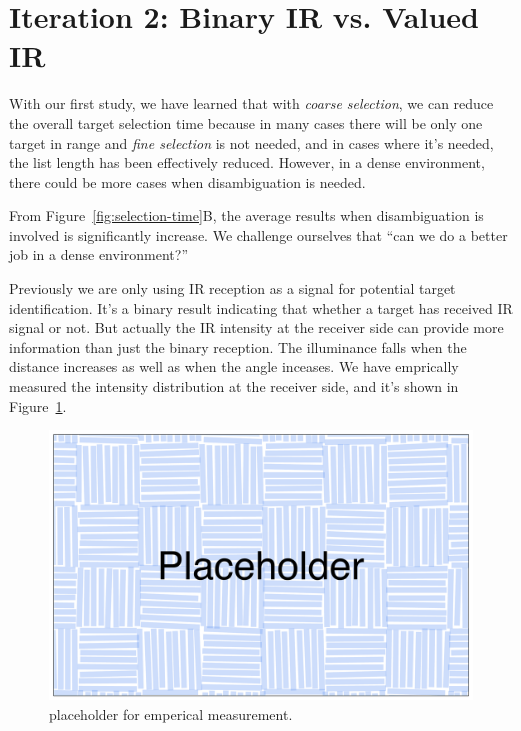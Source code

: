 \section{Iteration 2: Binary IR vs. Valued IR}

With our first study, we have learned that with {\em coarse selection}, we can reduce the overall target selection time because in many cases there will be only one target in range and {\em fine selection} is not needed, and in cases where it's needed, the list length has been effectively reduced. However, in a dense environment, there could be more cases when disambiguation is needed. 

From Figure~\ref{fig:selection-time}B, the average results when disambiguation is involved is significantly increase. We challenge ourselves that ``can we do a better job in a dense environment?''

Previously we are only using IR reception as a signal for potential target identification. It's a binary result indicating that whether a target has received IR signal or not. But actually the IR intensity at the receiver side can provide more information than just the binary reception. The illuminance falls when the distance increases as well as when the angle inceases.
We have emprically measured the intensity distribution at the receiver side, and it's shown in Figure~\ref{fig:measurement}. 

\begin{figure}[t]
\centering
\includegraphics[width=0.9\columnwidth]{figures/placeholder.pdf}
\caption{placeholder for emperical measurement.}
\label{fig:measurement}
\end{figure}

